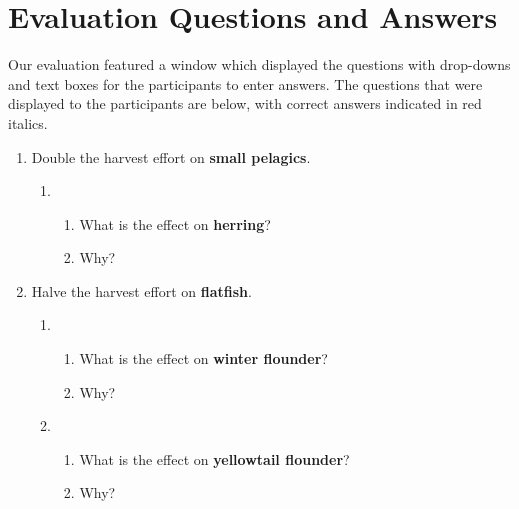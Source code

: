\chapter{Evaluation Questions and Answers}

Our evaluation featured a window which displayed the questions with drop-downs and text boxes for the participants to enter answers.  The questions that were displayed to the participants are below, with correct answers indicated in red italics.

\begin{enumerate}
\item Double the harvest effort on \textbf{small pelagics}.

\begin{enumerate}
\item 
\begin{enumerate}
\item What is the effect on \textbf{herring}? 
\item Why? 
\end{enumerate}
\end{enumerate}

\item Halve the harvest effort on \textbf{flatfish}.

\begin{enumerate}
\item 
\begin{enumerate}
\item What is the effect on \textbf{winter flounder}? 
\item Why? 
\end{enumerate}

\item 
\begin{enumerate}
\item What is the effect on \textbf{yellowtail flounder}? 
\item Why? 
\end{enumerate}
\end{enumerate}


\end{enumerate}
